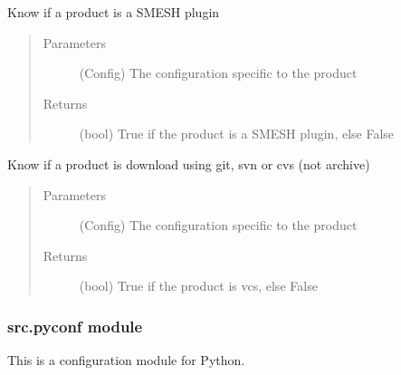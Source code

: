 \documentclass[a4paper,10pt,english]{sphinxmanual}
\begin{document}
\begin{fulllineitems}
\label{\detokenize{apidoc_src/src:src.product.product_is_smesh_plugin}}
Know if a product is a SMESH plugin
\begin{quote}\begin{description}
\item[{Parameters}] \leavevmode
{} \textendash{} (Config)
The configuration specific to the product

\item[{Returns}] \leavevmode
(bool)
True if the product is a SMESH plugin, else False

\end{description}\end{quote}

\end{fulllineitems}


\begin{fulllineitems}
\label{\detokenize{apidoc_src/src:src.product.product_is_vcs}}
Know if a product is download using git, svn or cvs (not archive)
\begin{quote}\begin{description}
\item[{Parameters}] \leavevmode
{} \textendash{} (Config)
The configuration specific to the product

\item[{Returns}] \leavevmode
(bool)
True if the product is vcs, else False

\end{description}\end{quote}

\end{fulllineitems}



\subsubsection{src.pyconf module}
\label{\detokenize{apidoc_src/src:src-pyconf-module}}\label{\detokenize{apidoc_src/src:module-src.pyconf}}
This is a configuration module for Python.
\end{document}
